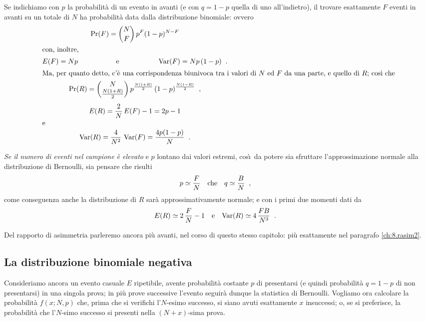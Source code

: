 Se indichiamo con $p$ la probabilit\`a di un evento in
avanti (e con $q = 1 - p$ quella di uno all'indietro), il
trovare esattamente $F$ eventi in avanti su un totale di $N$
ha probabilit\`a data dalla distribuzione binomiale: ovvero
\begin{gather*}
  \Pr(F) = \binom{N}{F} \, p^F (1 - p)^{N - F} \\
  \intertext{con, inoltre,}
  E(F) = Np \makebox[40mm]{e} \var(F) = N p \, (1 - p) \peq
  . \\
  \intertext{Ma, per quanto detto, c'\`e una corrispondenza
    biunivoca tra i valori di $N$ ed $F$ da una parte, e
    quello di $R$; cos\`\i\ che}
  \Pr(R) = \binom{N}{\frac{N (1 + R)}{2}} \, p^{\frac{N (1
      + R)}{2}} \, (1 - p)^{\frac{N (1 - R)}{2}} \peq ,
  \\[1ex]
  E(R) = \frac{2}{N} \, E(F) - 1 = 2 p - 1 \\
  \intertext{e}
  \var(R) = \frac{4}{N^2} \, \var(F) = \frac{4 p ( 1 -
    p)}{N} \peq .
\end{gather*}

\emph{Se il numero di eventi nel campione \`e elevato} e $p$
lontano dai valori estremi, cos\`\i\ da potere sia sfruttare
l'approssimazione normale alla distribuzione di Bernoulli,
sia pensare che risulti
\begin{align*}
  p &\simeq \frac{F}{N} &&\text{che} & q &\simeq \frac{B}{N}
  \;\; ,
\end{align*}
come conseguenza anche la distribuzione di $R$ sar\`a
approssimativamente normale; e con i primi due momenti dati
da
\begin{align*}
  E(R) &\simeq 2 \, \frac{F}{N} - 1 &&\text{e} & \operatorname{Var}(R)
  &\simeq 4 \, \frac{F B}{N^3} \;\; .
\end{align*}

Del rapporto di asimmetria parleremo ancora pi\`u avanti,
nel corso di questo stesso capitolo: pi\`u esattamente nel
paragrafo \ref{ch:8.rasim2}.%

\subsection{La distribuzione binomiale negativa}%
%
Consideriamo ancora un evento casuale $E$ ripetibile, avente
probabilit\`a costante $p$ di presentarsi (e quindi
probabilit\`a $q = 1 - p$ di non presentarsi) in una singola
prova; in pi\`u prove successive l'evento seguir\`a dunque
la statistica di Bernoulli.  Vogliamo ora calcolare la
probabilit\`a $f(x; N, p)$ che, prima che si verifichi
l'$N$-esimo successo, si siano avuti esattamente $x$
insuccessi; o, se si preferisce, la probabilit\`a che
l'$N$-simo successo si presenti nella $(N+x)$-sima prova.

